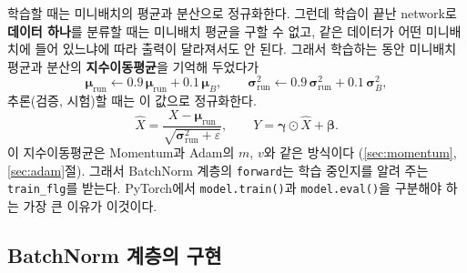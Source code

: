 \documentclass[11pt,a4paper]{article}
\begin{document}
학습할 때는 미니배치의 평균과 분산으로 정규화한다.
그런데 학습이 끝난 network로 \textbf{데이터 하나}를 분류할 때는 미니배치 평균을 구할 수 없고,
같은 데이터가 어떤 미니배치에 들어 있느냐에 따라 출력이 달라져서도 안 된다.
그래서 학습하는 동안 미니배치 평균과 분산의 \textbf{지수이동평균}을 기억해 두었다가
\[
\bm\mu_{\text{run}}\leftarrow0.9\,\bm\mu_{\text{run}}+0.1\,\bm\mu_B,\qquad
\bm\sigma^2_{\text{run}}\leftarrow0.9\,\bm\sigma^2_{\text{run}}+0.1\,\bm\sigma^2_B,
\]
추론(검증, 시험)할 때는 이 값으로 정규화한다.
\[
\hat X=\frac{X-\bm\mu_{\text{run}}}{\sqrt{\bm\sigma^2_{\text{run}}+\varepsilon}},\qquad Y=\bm\gamma\odot\hat X+\bm\beta.
\]
이 지수이동평균은 Momentum과 Adam의 $m$, $v$와 같은 방식이다 (\ref{sec:momentum}, \ref{sec:adam}절).
그래서 BatchNorm 계층의 \texttt{forward}는 학습 중인지를 알려 주는 \texttt{train\_flg}를 받는다.
PyTorch에서 \texttt{model.train()}과 \texttt{model.eval()}을 구분해야 하는 가장 큰 이유가 이것이다.

\subsection{BatchNorm 계층의 구현}\label{sec:bncode}
\end{document}

